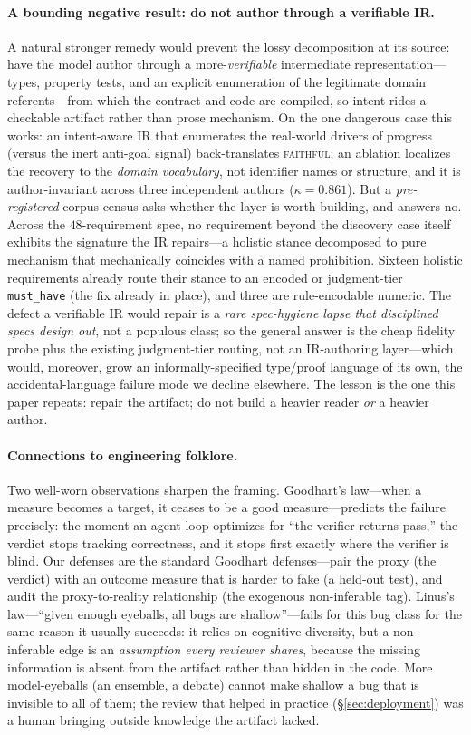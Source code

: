 \documentclass[11pt]{article}
\newcommand{\code}[1]{\texttt{#1}}
\begin{document}
\paragraph{A bounding negative result: do not author through a verifiable IR.}
A natural stronger remedy would prevent the lossy decomposition at its source: have the model author
through a more-\emph{verifiable} intermediate representation---types, property tests, and an explicit
enumeration of the legitimate domain referents---from which the contract and code are compiled, so
intent rides a checkable artifact rather than prose mechanism. On the one dangerous case this works: an
intent-aware IR that enumerates the real-world drivers of progress (versus the inert anti-goal signal)
back-translates \textsc{faithful}; an ablation localizes the recovery to the \emph{domain vocabulary},
not identifier names or structure, and it is author-invariant across three independent authors
($\kappa=0.861$). But a \emph{pre-registered} corpus census asks whether the layer is worth building,
and answers no. Across the $48$-requirement spec, no requirement beyond the discovery case itself
exhibits the signature the IR repairs---a holistic stance decomposed to pure mechanism that mechanically
coincides with a named prohibition. Sixteen holistic requirements already route their stance to an
encoded or judgment-tier \code{must\_have} (the fix already in place), and three are rule-encodable
numeric. The defect a verifiable IR would repair is a \emph{rare spec-hygiene lapse that disciplined
specs design out}, not a populous class; so the general answer is the cheap fidelity probe plus the
existing judgment-tier routing, not an IR-authoring layer---which would, moreover, grow an
informally-specified type/proof language of its own, the accidental-language failure mode we decline
elsewhere. The lesson is the one this paper repeats: repair the artifact; do not build a heavier reader
\emph{or} a heavier author.

\paragraph{Connections to engineering folklore.} Two well-worn observations sharpen the framing.
Goodhart's law---when a measure becomes a target, it ceases to be a good measure---predicts the
failure precisely: the moment an agent loop optimizes for ``the verifier returns pass,'' the verdict
stops tracking correctness, and it stops first exactly where the verifier is blind. Our defenses are
the standard Goodhart defenses---pair the proxy (the verdict) with an outcome measure that is harder
to fake (a held-out test), and audit the proxy-to-reality relationship (the exogenous non-inferable
tag). Linus's law---``given enough eyeballs, all bugs are shallow''---fails for this bug class for the
same reason it usually succeeds: it relies on cognitive diversity, but a non-inferable edge is an
\emph{assumption every reviewer shares}, because the missing information is absent from the artifact
rather than hidden in the code. More model-eyeballs (an ensemble, a debate) cannot make shallow a bug
that is invisible to all of them; the review that helped in practice (\S\ref{sec:deployment}) was a
human bringing outside knowledge the artifact lacked.
\end{document}
